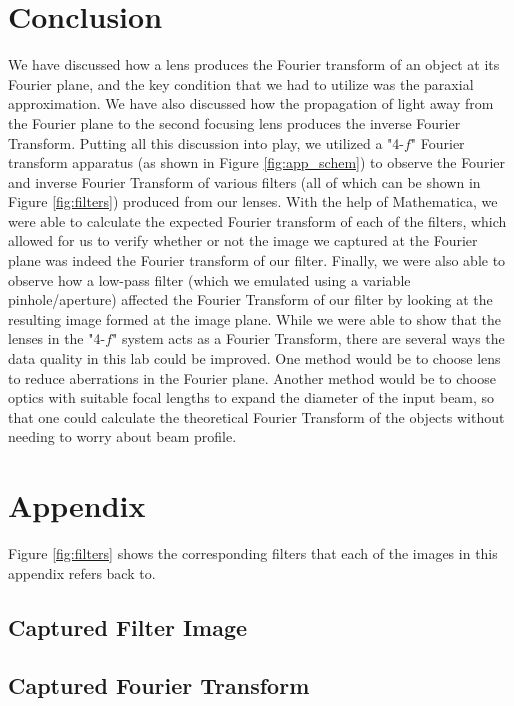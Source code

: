 \documentclass[twocolumn,amsmath,amssymb,pra]{revtex4-2}
\begin{document}
\section{Conclusion}
We have discussed how a lens produces the Fourier transform of an object at its Fourier plane, and the key condition that we had to utilize was the paraxial approximation. We have also discussed how the propagation of light away from the Fourier plane to the second focusing lens produces the inverse Fourier Transform. Putting all this discussion into play, we utilized a "4-$f$" Fourier transform apparatus (as shown in Figure \ref{fig:app_schem}) to observe the Fourier and inverse Fourier Transform of various filters (all of which can be shown in Figure \ref{fig:filters}) produced from our lenses. With the help of Mathematica, we were able to calculate the expected Fourier transform of each of the filters, which allowed for us to verify whether or not the image we captured at the Fourier plane was indeed the Fourier transform of our filter.
Finally, we were also able to observe how a low-pass filter (which we emulated using a variable pinhole/aperture) affected the Fourier Transform of our filter by looking at the resulting image formed at the image plane. While we were able to show that the lenses in the "4-$f$" system acts as a Fourier Transform, there are several ways the data quality in this lab could be improved. One method would be to choose lens to reduce aberrations in the Fourier plane. Another method would be to choose optics with suitable focal lengths to expand the diameter of the input beam, so that one could calculate the theoretical Fourier Transform of the objects without needing to worry about beam profile.




\clearpage
\onecolumngrid
\section{Appendix}
Figure \ref{fig:filters} shows the corresponding filters that each of the images in this appendix refers back to.

\subsection{Captured Filter Image}


\subsection{Captured Fourier Transform}

\end{document}
